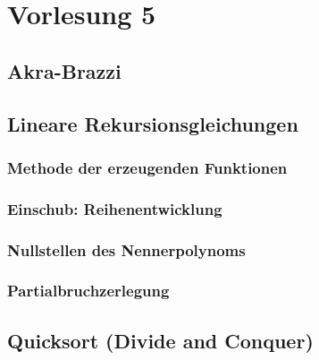 \chapter{Vorlesung 5}


\section{Akra-Brazzi}


\section{Lineare Rekursionsgleichungen}


\subsection{Methode der erzeugenden Funktionen}

\subsection{Einschub: Reihenentwicklung}

\subsection{Nullstellen des Nennerpolynoms}

\subsection{Partialbruchzerlegung}



\section{Quicksort (Divide and Conquer)}